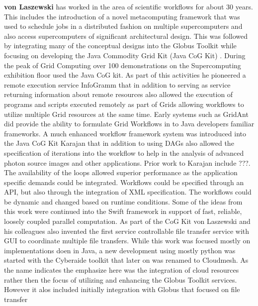 \documentclass[utf8]{FrontiersinVancouver} %
\begin{document}
{\bf von Laszewski} has worked in the area of scientific workflows for about 30 years. This includes the introduction of a novel metacomputing framework \citep{las-99-loosely,las-94-ecwmf,las-96-ecwmf} that was used to schedule jobs in a distributed fashion on multiple supercomputers and also access supercomputers of significant architectural design. This was followed by integrating many of the conceptual designs into the Globus Toolkit while focusing on developing the Java Commodity Grid Kit (Java CoG Kit) \citep{las-06-workcoordination,
las-06-workflow-book,
las-06-exp-a,
las-05-workflowrepo,
las-05-workflow-jgc,
las-05-exp,
las-04-abstraction-j,
las-03-gridcomputing,
las-02-javacog,
las-00-grande,
las-01-cog-concurency}. 
During the peak of Grid Computing over 100 demonstrations on the Supercomputing exhibition floor used the Java CoG kit. As part of this activities he pioneered a remote execution service InfoGramm 
\citep{las-02-infogram}
that in addition to serving as service returning information about remote resources also allowed the execution of programs and scripts executed remotely as part of Grids allowing workflows to utilize multiple Grid resources at the same time. Early systems such as GridAnt \citep{las-04-gridant} 
did provide the ability to formulate Grid Workflows in to Java developers familiar frameworks. A much enhanced workflow framework  system was introduced into the  Java CoG Kit Karajan \citep{las-06-workflow-book} that in addition to using DAGs also allowed the specification of iterations into the workflow to help in the analysis of advanced photon source images and other applications. Prior work to Karajan include ???. The availability of the loops allowed superior performance as the application specific demands could be integrated. Workflows could be specified through an API, but also through the integration of XML specification. The workflows could be dynamic and changed based on runtime conditions. Some of the ideas from this work were continued into the Swift framework in support of fast, reliable, loosely coupled parallel computation. 
As part of the CoG Kit von Laszewski and his colleagues also invented the first service controllable file transfer service with GUI to coordinate multiple file transfers. While this work was focused mostly on implementations doen in Java, a new development using mostly python was started with the Cyberaide toolkit \citep{las-09-ccgrid} that later on was renamed to Cloudmesh. As the name indicates the emphasize here was the integration of cloud resources rather then the focus of utilizing and enhancing the Globus Toolkit services. However it alos included initially integration with Globus that focused on file transfer 
\end{document}
